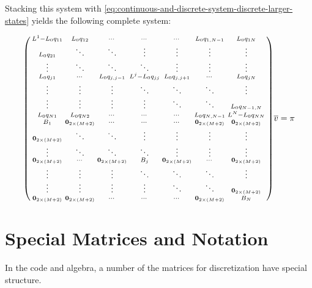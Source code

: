 \documentclass[11pt]{article}
\newenvironment{psmallmatrix}
{\left(\begin{smallmatrix}}
	{\end{smallmatrix}\right)}
\theoremstyle{definition}
\begin{document}
Stacking this system with \eqref{eq:continuous-and-discrete-system-discrete-larger-states} yields the following complete system:


\begin{align}
\begin{psmallmatrix}
{L}^1 -L_0 q_{11} & L_0 q_{12} & \cdots &  \cdots & \cdots & L_0 q_{1,N-1} & L_0 q_{1N} \\ 
L_0 q_{21} & \ddots & \ddots & \vdots & \vdots & \vdots & \vdots  \\
\vdots & \ddots & \ddots & \ddots  & \vdots & \vdots & \vdots
\\
L_0 q_{j1} &  \cdots & L_0 q_{j,j-1} & {L}^j - L_0 q_{jj} & L_0 q_{j,j+1} & \cdots & L_0 q_{jN} \\
\vdots & \vdots& \vdots &  \ddots & \ddots & \ddots  & \vdots \\ 
\vdots & \vdots  & \vdots& \vdots &  \ddots & \ddots & L_0 q_{N-1,N} \\
L_0 q_{N1} & L_0 q_{N2} & \cdots &  \cdots & \cdots & L_0 q_{N,N-1} & {L}^N - L_0 q_{NN} \\
B_1 & \mathbf{0}_{2 \times (M+2)} & \cdots &  \cdots & \cdots & \mathbf{0}_{2 \times (M+2)}  & \mathbf{0}_{2 \times (M+2)} \\ 
\mathbf{0}_{2 \times (M+2)} & \ddots & \ddots & \vdots & \vdots & \vdots & \vdots  \\
\vdots & \ddots & \ddots & \ddots  & \vdots & \vdots & \vdots
\\
\mathbf{0}_{2 \times (M+2)} &  \cdots & \mathbf{0}_{2 \times (M+2)} & B_j & \mathbf{0}_{2 \times (M+2)} & \cdots & \mathbf{0}_{2 \times (M+2)} \\
\vdots & \vdots& \vdots &  \ddots & \ddots & \ddots  & \vdots \\ 
\vdots & \vdots  & \vdots& \vdots &  \ddots & \ddots & \mathbf{0}_{2 \times (M+2)} \\
\mathbf{0}_{2 \times (M+2)} & \mathbf{0}_{2 \times (M+2)} & \cdots &  \cdots & \cdots & \mathbf{0}_{2 \times (M+2)} & B_N
\end{psmallmatrix}
\overline{v}
=
\pi 
\end{align}

\newpage

\appendix

\section{Special Matrices and Notation}\label{sec:special-matrices}
In the code and algebra, a number of the matrices for discretization have special structure.
\end{document}
